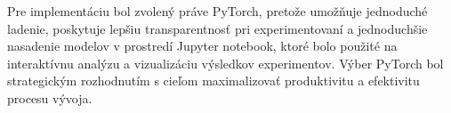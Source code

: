 Pre implementáciu bol zvolený práve PyTorch, pretože umožňuje jednoduché ladenie, poskytuje lepšiu transparentnosť pri experimentovaní a jednoduchšie nasadenie modelov v prostredí Jupyter notebook, ktoré bolo použité na interaktívnu analýzu a vizualizáciu výsledkov experimentov. Výber PyTorch bol strategickým rozhodnutím s cieľom maximalizovať produktivitu a efektivitu procesu vývoja.

% 
% 
% 
% 
% 
